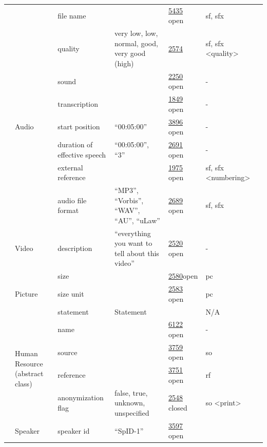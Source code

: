 \documentclass[a4paper,12pt]{article}
\begin{document}
\begin{center}
\begin{longtable}{*7{p{2cm}}}
& & file name & & \href{http://www.isocat.org/datcat/DC-5435}{5435} open & sf, sfx & \\ \cmidrule{2-7}
& \multirow{7}{2cm}{Audio} & quality & very low, low, normal, good, very good (high) & \href{http://www.isocat.org/datcat/DC-2574}{2574} & sf, sfx \textless quality\textgreater & \\ \cmidrule{3-7}
& & sound & & \href{http://www.isocat.org/datcat/DC-2250}{2250} open & - & \\ \cmidrule{3-7}
& & transcription & & \href{http://www.isocat.org/datcat/DC-1849}{1849} open & - & \\ \cmidrule{3-7}
& & start position & ``00:05:00'' & \href{http://www.isocat.org/datcat/DC-3896}{3896} open & - & \\ \cmidrule{3-7}
& & duration of effective speech & ``00:05:00'', ``3'' & \href{http://www.isocat.org/datcat/DC-2691}{2691} open & - & \\ \cmidrule{3-7}
& & external reference & & \href{http://www.isocat.org/datcat/DC-1975}{1975} open & sf, sfx \textless numbering\textgreater & \\ \cmidrule{3-7}
& & audio file format & ``MP3'', ``Vorbis'', ``WAV'', ``AU'', ``uLaw'' & \href{http://www.isocat.org/datcat/DC-2689}{2689} open & sf, sfx & \\ \cmidrule{2-7}
& \multirow{1}{2cm}{Video} & description & ``everything you want to tell about this video'' & \href{http://www.isocat.org/datcat/DC-2520}{2520} open & - & \\ \cmidrule{2-7}
& \multirow{3}{2cm}{Picture} & size & & \href{http://www.isocat.org/datcat/DC-2580}{2580}open & pc & \\ \cmidrule{3-7}
& & size unit & & \href{http://www.isocat.org/datcat/DC-2583}{2583} open & pc & \\ \cmidrule{3-7}
& & statement & Statement & & N/A & \\ \cmidrule{2-7}
& \multirow{4}{2cm}{Human Resource (abstract class)} & name & & \href{http://www.isocat.org/datcat/DC-6122}{6122} open & - & \\ \cmidrule{3-7}
& & source & & \href{http://www.isocat.org/datcat/DC-3759}{3759} open & so & \\ \cmidrule{3-7}
& & reference & & \href{http://www.isocat.org/datcat/DC-3751}{3751} open & rf & \\ \cmidrule{3-7}
& & a\-no\-ny\-mi\-za\-tion flag & false, true, unknown, unspecified & \href{http://www.isocat.org/datcat/DC-2548}{2548} closed & so \textless print\textgreater & \\ \cmidrule{2-7}
& \multirow{1}{2cm}{Speaker} & speaker id & ``SpID-1'' & \href{http://www.isocat.org/datcat/DC-3597}{3597} open & & \\ \hline\hline
\end{longtable}
\end{center}
\end{document}
